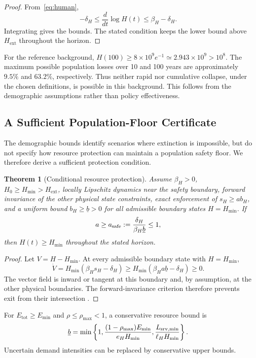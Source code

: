 \documentclass[12pt,a4paper]{article}
\newtheorem{theorem}[proposition]{Theorem}
\theoremstyle{remark}
\newcommand{\Etotal}{E_{\mathrm{tot}}}
\newcommand{\Hext}{H_{\mathrm{ext}}}
\newcommand{\Hmin}{H_{\min}}
\begin{document}
\begin{proof}
From~\eqref{eq:human},
\[
-\delta_H\le\frac{d}{dt}\log H(t)\le\beta_H-\delta_H.
\]
Integrating gives the bounds. The stated condition keeps the lower bound above $\Hext$ throughout the horizon.
\end{proof}

For the reference background,
$H(100)\ge8\times10^9e^{-1}\simeq2.943\times10^9>10^8$.
The maximum possible population losses over 10 and 100 years are approximately $9.5\%$ and $63.2\%$, respectively. Thus neither rapid nor cumulative collapse, under the chosen definitions, is possible in this background. This follows from the demographic assumptions rather than policy effectiveness.


\subsection{A Sufficient Population-Floor Certificate}

The demographic bounds identify scenarios where extinction is impossible, but do not specify how resource protection can maintain a population safety floor. We therefore derive a sufficient protection condition.

\begin{theorem}[Conditional resource protection]\label{thm:safety}
Assume $\beta_H>0$, $H_0\ge\Hmin>\Hext$, locally Lipschitz dynamics near the safety boundary, forward invariance of the other physical state constraints, exact enforcement of $s_H\ge ab_H$, and a uniform bound $b_H\ge\underline b>0$ for all admissible boundary states $H=\Hmin$. If
\begin{equation}\label{eq:asafe}
a\ge a_{\rm safe}:=\frac{\delta_H}{\beta_H\underline b}\le1,
\end{equation}
then $H(t)\ge\Hmin$ throughout the stated horizon.
\end{theorem}

\begin{proof}
Let $V=H-\Hmin$. At every admissible boundary state with $H=\Hmin$,
\[
\dot V
=\Hmin(\beta_Hs_H-\delta_H)
\ge\Hmin(\beta_Ha\underline b-\delta_H)
\ge0.
\]
The vector field is inward or tangent at this boundary and, by assumption, at the other physical boundaries. The forward-invariance criterion therefore prevents exit from their intersection \cite{aubin}.
\end{proof}

For $\Etotal\ge E_{\min}$ and $\rho\le\rho_{\max}<1$, a conservative resource bound is
\begin{equation}\label{eq:bunder}
\underline b=\min\left\{
1,\frac{(1-\rho_{\max})E_{\min}}{e_H\Hmin},
\frac{L_{{\rm srv},\min}}{\ell_H\Hmin}
\right\}.
\end{equation}
Uncertain demand intensities can be replaced by conservative upper bounds.
\end{document}
